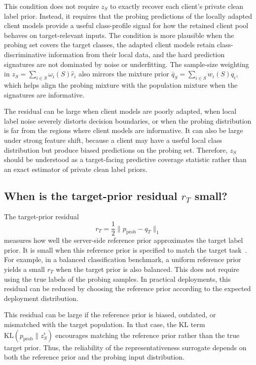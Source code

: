 This condition does not require $z_S$ to exactly recover each client's private clean label prior.
Instead, it requires that the probing predictions of the locally adapted client models provide a useful class-profile signal for how the retained client pool behaves on target-relevant inputs.
The condition is more plausible when the probing set covers the target classes, the adapted client models retain class-discriminative information from their local data, and the hard prediction signatures are not dominated by noise or underfitting.
The sample-size weighting in $z_S=\sum_{i\in S}\omega_i(S)\hat r_i$ also mirrors the mixture prior $\bar q_S=\sum_{i\in S}w_i(S)q_i$, which helps align the probing mixture with the population mixture when the signatures are informative.

The residual can be large when client models are poorly adapted, when local label noise severely distorts decision boundaries, or when the probing distribution is far from the regions where client models are informative.
It can also be large under strong feature shift, because a client may have a useful local class distribution but produce biased predictions on the probing set.
Therefore, $z_S$ should be understood as a target-facing predictive coverage statistic rather than an exact estimator of private clean label priors.

\subsection{When is the target-prior residual $r_T$ small?}
\label{app:target_prior_residual}

The target-prior residual
\[
r_T
=
\frac12\|p_{\mathrm{prob}}-q_T\|_1
\]
measures how well the server-side reference prior approximates the target label prior.
It is small when this reference prior is specified to match the target task~\cite{ben2010theory,lipton2018labelshift}.
For example, in a balanced classification benchmark, a uniform reference prior yields a small $r_T$ when the target prior is also balanced.
This does not require using the true labels of the probing samples.
In practical deployments, this residual can be reduced by choosing the reference prior according to the expected deployment distribution.

This residual can be large if the reference prior is biased, outdated, or mismatched with the target population.
In that case, the KL term $\mathrm{KL}(p_{\mathrm{prob}}\|z_S^\epsilon)$ encourages matching the reference prior rather than the true target prior.
Thus, the reliability of the representativeness surrogate depends on both the reference prior and the probing input distribution.

